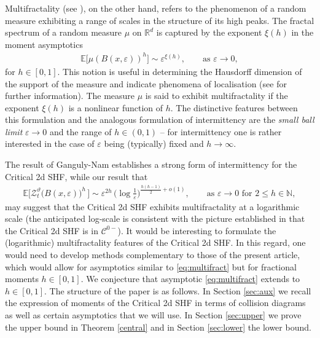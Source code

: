 \documentclass[a4paper,reqno,11pt]{amsart}
\numberwithin{equation}{section}
\theoremstyle{mytheorem}
\newcommand{\bbE}{{\ensuremath{\mathbb E}} }
\newcommand{\cC}{{\ensuremath{\mathcal C}} }
\newcommand{\R}{\mathbb{R}}
\newcommand{\N}{\mathbb{N}}
\renewcommand{\epsilon}{\varepsilon}
\renewcommand{\theta}{\vartheta}
\begin{document}
Multifractality (see \cite{F13, BP24}), on the other hand, refers to the phenomenon of a random measure
 exhibiting a range of scales in the structure of its high peaks.
 The fractal spectrum of a random measure $\mu$ on $\R^d$ is captured by the exponent $\xi(h)$ in
the moment asymptotics
\begin{align*}
\bbE\big[\mu(B(x,\epsilon))^h \big] \sim \epsilon^{\xi(h)},\qquad \text{as $\epsilon\to0$},
\end{align*}
for $h\in [0,1]$. This notion is useful in determining the Hausdorff dimension of the support of the measure and
indicate phenomena of localisation (see \cite{BP24} for further information). 
The measure $\mu$ is said to exhibit multifractality if the exponent $\xi(h)$ is a nonlinear
function of $h$. The distinctive features between this formulation and the analogous formulation of intermittency
are the {\it small ball limit} $\epsilon\to0$ and the range of $h\in (0,1)$ -- for intermittency one is rather interested in 
the case of $\epsilon$ being (typically) fixed and $h\to \infty$. 


The result of Ganguly-Nam \cite{GN25} establishes a strong form of intermittency for the Critical 2d SHF, while
our result that
\begin{align}\label{eq:multifract}
\bbE\big[\mathscr{Z}_{t}^\theta\big(B(x,\epsilon)\big)^h\,\big] 
\sim \epsilon^{2h} \,\big(\log \tfrac{1}{\epsilon}\big)^{\frac{h(h-1)}{2}+o(1)}, \qquad 
\text{as $\epsilon\to0$ for $2\le h\in \N$},
\end{align}
may suggest that the Critical 2d SHF exhibits multifractality at a logarithmic scale (the anticipated log-scale is
consistent with the
picture established in \cite{CSZ25} that the Critical 2d SHF is in $\cC^{0-}$).
 It would be interesting
to formulate the (logarithmic) multifractality features of the Critical 2d SHF. In this regard, one would need to 
develop methods complementary to those of the present article, 
which would allow for asymptotics similar to \eqref{eq:multifract} but for fractional moments $h\in [0,1]$.
We conjecture that asymptotic \eqref{eq:multifract} extends to $h\in [0,1]$.
\vskip 2mm
The structure of the paper is as follows. In Section \ref{sec:aux} we recall the expression of moments of the Critical 2d SHF in 
terms of collision diagrams as well as certain asymptotics that we will use. In Section \ref{sec:upper} we prove the upper
bound in Theorem \ref{central} and in Section \ref{sec:lower} the lower bound. 


\end{document}
